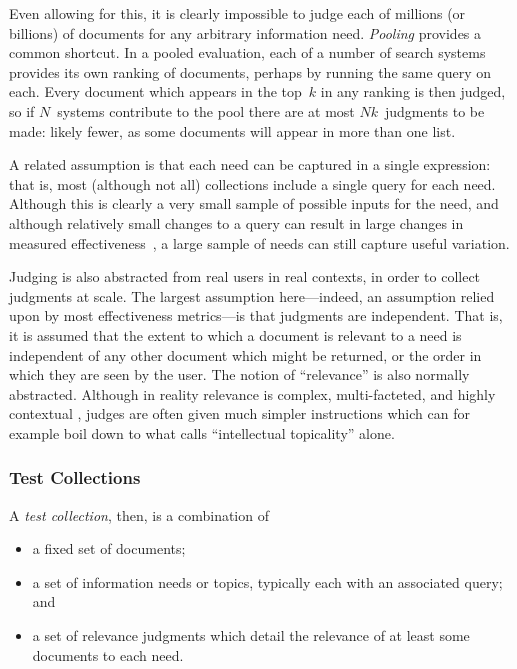 \documentclass[openany]{now} %
\begin{document}
Even allowing for this, it is clearly impossible to judge each of millions (or billions) of documents for any arbitrary information need. \emph{Pooling} provides a common shortcut. In a pooled evaluation, each of a number of search systems provides its own ranking of documents, perhaps by running the same query on each. Every document which appears in the top~$k$ in any ranking is then judged, so if $N$~systems contribute to the pool there are at most $Nk$~judgments to be made: likely fewer, as some documents will appear in more than one list.

A related assumption is that each need can be captured in a single expression: that is, most (although not all) collections include a single query for each need.  Although this is clearly a very small sample of possible inputs for the need, and although relatively small changes to a query can result in large changes in measured effectiveness~\citep{bailey15user}, a large sample of needs can still capture useful variation.

Judging is also abstracted from real users in real contexts, in order to collect judgments at scale. The largest assumption here---indeed, an assumption relied upon by most effectiveness metrics---is that judgments are independent. That is, it is assumed that the extent to which a document is relevant to a need is independent of any other document which might be returned, or the order in which they are seen by the user. The notion of ``relevance'' is also normally abstracted. Although in reality relevance is complex, multi-facteted, and highly contextual \citep{borlund2003,saracevic16relevance}, judges are often given much simpler instructions which can for example boil down to what \cite{borlund2003} calls ``intellectual topicality'' alone.

\subsubsection{Test Collections}

A \emph{test collection}, then, is a combination of 

\begin{itemize}
	\item a fixed set of documents; 
	\item a set of information needs or topics, typically each with an associated query; and 
	\item a set of relevance judgments which detail the relevance of at least some documents to each need.
\end{itemize}
\end{document}
